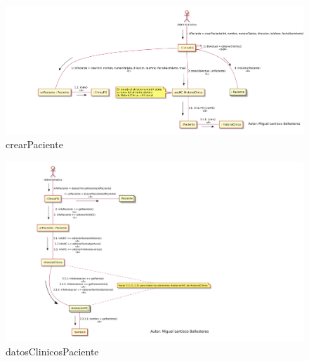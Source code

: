 \documentclass[11pt,a4paper]{article}
\begin{document}
\begin{figure}[H]
	\caption{crearPaciente}
	\centering
	\includegraphics[width=\textwidth,height=\textheight,keepaspectratio]{Diagramas/crearPaciente}
\end{figure}

\begin{figure}[H]
	\caption{datosClinicosPaciente}
	\centering
	\includegraphics[width=\textwidth,height=\textheight,keepaspectratio]{Diagramas/datosClinicosPaciente}
\end{figure}
\end{document}
